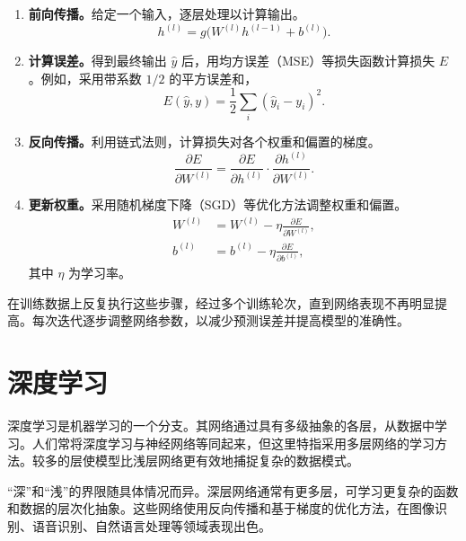 \begin{enumerate}
\item \textbf{前向传播。}给定一个输入，逐层处理以计算输出。
\begin{equation}
h^{(l)}=g\bigl(W^{(l)}h^{(l-1)}+b^{(l)}\bigr).
\label{eq:appa-forward}
\end{equation}
\item \textbf{计算误差。}得到最终输出 $\hat{y}$ 后，用均方误差（MSE）等损失函数计算损失 $E$。例如，采用带系数 $1/2$ 的平方误差和，
\begin{equation}
E(\hat{y},y)=\frac12\sum_i(\hat{y}_i-y_i)^2.
\label{eq:appa-square-error}
\end{equation}
\item \textbf{反向传播。}利用链式法则，计算损失对各个权重和偏置的梯度。
\begin{equation}
\frac{\partial E}{\partial W^{(l)}}=
\frac{\partial E}{\partial h^{(l)}}\cdot
\frac{\partial h^{(l)}}{\partial W^{(l)}}.
\label{eq:appa-backprop}
\end{equation}
\item \textbf{更新权重。}采用随机梯度下降（SGD）等优化方法调整权重和偏置。
\begin{align}
W^{(l)}&=W^{(l)}-\eta\frac{\partial E}{\partial W^{(l)}},
\label{eq:appa-update-weight}\\
b^{(l)}&=b^{(l)}-\eta\frac{\partial E}{\partial b^{(l)}},
\label{eq:appa-update-bias}
\end{align}
其中 $\eta$ 为学习率。
\end{enumerate}

在训练数据上反复执行这些步骤，经过多个训练轮次，直到网络表现不再明显提高。每次迭代逐步调整网络参数，以减少预测误差并提高模型的准确性。

\section{深度学习}
深度学习是机器学习的一个分支。其网络通过具有多级抽象的各层，从数据中学习。人们常将深度学习与神经网络等同起来，但这里特指采用多层网络的学习方法。较多的层使模型比浅层网络更有效地捕捉复杂的数据模式。

“深”和“浅”的界限随具体情况而异。深层网络通常有更多层，可学习更复杂的函数和数据的层次化抽象。这些网络使用反向传播和基于梯度的优化方法，在图像识别、语音识别、自然语言处理等领域表现出色。

